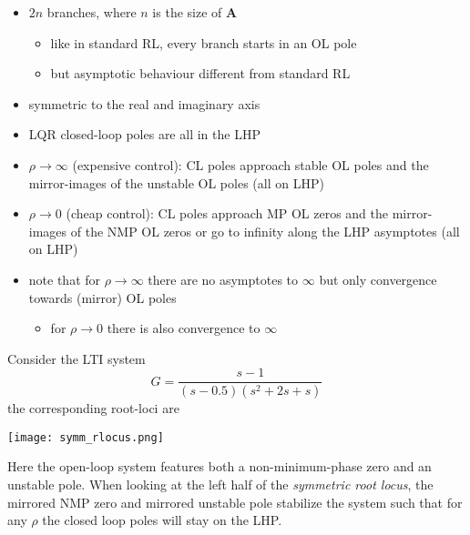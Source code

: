 \begin{itemize}
    \item $2n$ branches, where $n$ is the size of $\mathbf{A}$
    \begin{itemize}
        \item like in standard RL, every branch starts in an OL pole
        \item but asymptotic behaviour different from standard RL
    \end{itemize}
    \item symmetric to the real and imaginary axis
    \item LQR closed-loop poles are all in the LHP
    \item $\rho \rightarrow \infty$ (expensive control):\newline
          CL poles approach stable OL poles and the mirror-images of the unstable OL poles (all on LHP)
    \item $\rho \rightarrow 0$ (cheap control):\newline
          CL poles approach MP OL zeros and the mirror-images of the NMP OL zeros or go to infinity along the LHP asymptotes (all on LHP)
    \item note that for $\rho \rightarrow \infty$ there are no asymptotes to $\infty$ but only convergence towards (mirror) OL poles
    \begin{itemize}
        \item for $\rho \rightarrow 0$ there is also convergence to $\infty$
    \end{itemize}
\end{itemize}

\begin{examplesection}
    Consider the LTI system
    \noindent\begin{equation*}
        G = \frac{s-1}{(s-0.5)(s^2+2s+s)}
    \end{equation*}
    the corresponding root-loci are
    \begin{center}
        \texttt{[image: symm\_rlocus.png]}
    \end{center}
    Here the open-loop system features both a non-minimum-phase zero and an unstable pole.
    When looking at the left half of the \textit{symmetric root locus}, the mirrored NMP zero and mirrored unstable pole stabilize the system such that
    for any $\rho$ the closed loop poles will stay on the LHP.
\end{examplesection}

